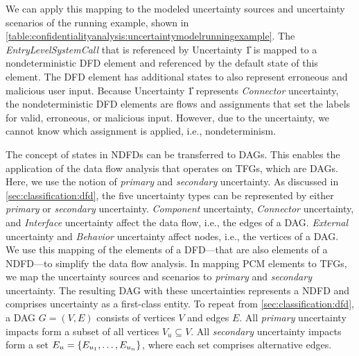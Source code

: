 We can apply this mapping to the modeled uncertainty sources and uncertainty scenarios of the running example, shown in \autoref{table:confidentialityanalysis:uncertaintymodelrunningexample}.
The \emph{EntryLevelSystemCall} that is referenced by Uncertainty \U{1} is mapped to a nondeterministic \ac{DFD} element and referenced by the default state of this element.
The \ac{DFD} element has additional states to also represent erroneous and malicious user input.
Because Uncertainty \U{1} represents \emph{Connector} uncertainty, the nondeterministic \ac{DFD} elements are flows and assignments that set the labels for valid, erroneous, or malicious input.
However, due to the uncertainty, we cannot know which assignment is applied, i.e., nondeterminism.


The concept of states in \acp{NDFD} can be transferred to \acp{DAG}.
This enables the application of the data flow analysis that operates on \acp{TFG}, which are \acp{DAG}.
Here, we use the notion of \emph{primary} and \emph{secondary} uncertainty.
As discussed in \autoref{sec:classification:dfd}, the five uncertainty types can be represented by either \emph{primary} or \emph{secondary} uncertainty.
\emph{Component} uncertainty, \emph{Connector} uncertainty, and \emph{Interface} uncertainty affect the data flow, i.e., the edges of a \ac{DAG}.
\emph{External} uncertainty and \emph{Behavior} uncertainty affect nodes, i.e., the vertices of a \ac{DAG}.
We use this mapping of the elements of a \ac{DFD}---that are also elements of a \ac{NDFD}---to simplify the data flow analysis.
In mapping \ac{PCM} elements to \acp{TFG}, we map the uncertainty sources and scenarios to \emph{primary} and \emph{secondary} uncertainty.
The resulting \ac{DAG} with these uncertainties represents a \ac{NDFD} and comprises uncertainty as a first-class entity.
To repeat from \autoref{sec:classification:dfd}, a \ac{DAG} $G = (V, E)$ consists of vertices $V$ and edges $E$.
All \emph{primary} uncertainty impacts form a subset of all vertices $V_{u} \subseteq V$.
All \emph{secondary} uncertainty impacts form a set $E_{u} = \{ E_{u_{1}}, \dots, E_{u_{n}} \}$, where each set comprises alternative edges.

